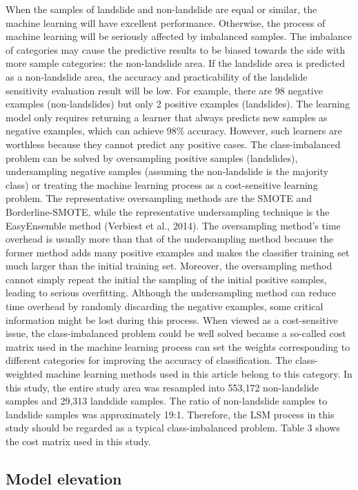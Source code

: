 \documentclass[a4paper,fleqn]{cas-sc}
\begin{document}
When the samples of landslide and non-landslide are equal or similar, the machine learning will have excellent performance. 
Otherwise, the process of machine learning will be seriously affected by imbalanced samples. 
The imbalance of categories may cause the predictive results to be biased towards the side with more sample categories: the non-landslide area. 
If the landslide area is predicted as a non-landslide area, the accuracy and practicability of the landslide sensitivity evaluation result will be low. 
For example, there are 98 negative examples (non-landslides) but only 2 positive examples (landslides). 
The learning model only requires returning a learner that always predicts new samples as negative examples, which can achieve 98\% accuracy. 
However, such learners are worthless because they cannot predict any positive cases.
The class-imbalanced problem can be solved by oversampling positive samples (landslides), undersampling negative samples (assuming the non-landslide is the majority class) or treating the machine learning process as a cost-sensitive learning problem. 
The representative oversampling methods are the SMOTE and Borderline-SMOTE, while the representative undersampling technique is the EasyEnsemble method (Verbiest et al., 2014). 
The oversampling method's time overhead is usually more than that of the undersampling method because the former method adds many positive examples and makes the classifier training set much larger than the initial training set. 
Moreover, the oversampling method cannot simply repeat the initial the sampling of the initial positive samples, leading to serious overfitting. 
Although the undersampling method can reduce time overhead by randomly discarding the negative examples, some critical information might be lost during this process. 
When viewed as a cost-sensitive issue, the class-imbalanced problem could be well solved because a so-called cost matrix used in the machine learning process can set the weights corresponding to different categories for improving the accuracy of classification. 
The class-weighted machine learning methods used in this article belong to this category.
In this study, the entire study area was resampled into 553,172 non-landslide samples and 29,313 landslide samples. 
The ratio of non-landslide samples to landslide samples was approximately 19:1. 
Therefore, the LSM process in this study should be regarded as a typical class-imbalanced problem. 
Table 3 shows the cost matrix used in this study.

\subsection{Model elevation}
\end{document}
